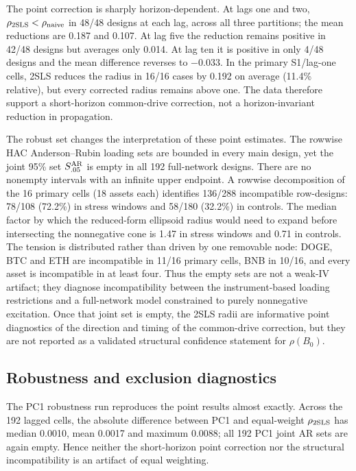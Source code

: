 \documentclass[12pt]{article}
\theoremstyle{plain}\newtheorem{theorem}{Theorem}[section]\newtheorem{proposition}[theorem]{Proposition}\newtheorem{lemma}[theorem]{Lemma}\newtheorem{corollary}[theorem]{Corollary}
\theoremstyle{definition}\newtheorem{definition}[theorem]{Definition}\newtheorem{assumption}[theorem]{Assumption}\newtheorem{remark}[theorem]{Remark}
\begin{document}
The point correction is sharply horizon-dependent. At lags one and two, $\rho_{\rm 2SLS}<\rho_{\rm naive}$ in 48/48 designs at each lag, across all three partitions; the mean reductions are 0.187 and 0.107. At lag five the reduction remains positive in 42/48 designs but averages only 0.014. At lag ten it is positive in only 4/48 designs and the mean difference reverses to $-0.033$. In the primary S1/lag-one cells, 2SLS reduces the radius in 16/16 cases by 0.192 on average (11.4\% relative), but every corrected radius remains above one. The data therefore support a short-horizon common-drive correction, not a horizon-invariant reduction in propagation.



The robust set changes the interpretation of these point estimates. The rowwise HAC Anderson--Rubin loading sets are bounded in every main design, yet the joint 95\% set $S^{\rm AR}_{.05}$ is empty in all 192 full-network designs. There are no nonempty intervals with an infinite upper endpoint. A rowwise decomposition of the 16 primary cells (18 assets each) identifies 136/288 incompatible row-designs: 78/108 (72.2\%) in stress windows and 58/180 (32.2\%) in controls. The median factor by which the reduced-form ellipsoid radius would need to expand before intersecting the nonnegative cone is 1.47 in stress windows and 0.71 in controls. The tension is distributed rather than driven by one removable node: DOGE, BTC and ETH are incompatible in 11/16 primary cells, BNB in 10/16, and every asset is incompatible in at least four. Thus the empty sets are not a weak-IV artifact; they diagnose incompatibility between the instrument-based loading restrictions and a full-network model constrained to purely nonnegative excitation. Once that joint set is empty, the 2SLS radii are informative point diagnostics of the direction and timing of the common-drive correction, but they are not reported as a validated structural confidence statement for $\rho(B_0)$.

\subsection{Robustness and exclusion diagnostics}
The PC1 robustness run reproduces the point results almost exactly. Across the 192 lagged cells, the absolute difference between PC1 and equal-weight $\rho_{\rm 2SLS}$ has median 0.0010, mean 0.0017 and maximum 0.0088; all 192 PC1 joint AR sets are again empty. Hence neither the short-horizon point correction nor the structural incompatibility is an artifact of equal weighting.
\end{document}
